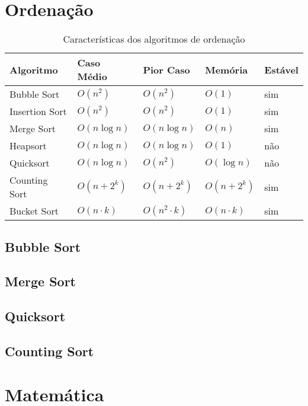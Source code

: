 \documentclass[12pt,a4paper]{article}
\begin{document}
	\section{Ordenação}
		\begin{table}[h]
			\centering
			\begin{tabular}{l l l l l}
				\hline\hline
				\bf{Algoritmo}	& \bf{Caso Médio}	& \bf{Pior Caso}	& \bf{Memória}	& \bf{Estável}	\\
				\hline\hline
				Bubble Sort		& \(O(n^2)\)		& \(O(n^2)\)		& \(O(1)\)		& sim			\\
				Insertion Sort	& \(O(n^2)\)		& \(O(n^2)\)		& \(O(1)\)		& sim			\\
				Merge Sort		& \(O(n \log n)\)	& \(O(n \log n)\)	& \(O(n)\)		& sim			\\
				Heapsort		& \(O(n \log n)\)	& \(O(n \log n)\)	& \(O(1)\)		& não			\\
				Quicksort		& \(O(n \log n)\)	& \(O(n^2)\)		& \(O(\log n)\) & não			\\
				\hline
				Counting Sort	& \(O(n + 2^k)\)	& \(O(n + 2^k)\)	& \(O(n + 2^k)\) & sim			\\
				Bucket Sort		& \(O(n \cdot k)\)	& \(O(n^2\cdot k)\)	& \(O(n \cdot k)\) & sim		\\
				\hline\hline
			\end{tabular}
			\caption{Características dos algoritmos de ordenação}
		\end{table}
		\subsection{Bubble Sort}
			
		\subsection{Merge Sort}
			
		\subsection{Quicksort}
			
		\subsection{Counting Sort}
			
	
	\section{Matemática}
\end{document}
